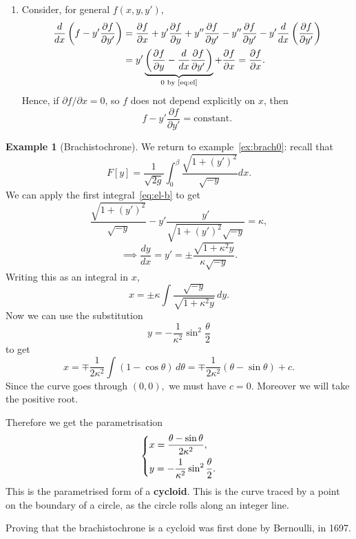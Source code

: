 \documentclass[12pt]{article}
\theoremstyle{definition}
\newtheorem{example}{Example}[section]
\theoremstyle{remark}
\begin{document}
\begin{enumerate}[resume*]
	\item Consider, for general $f(x, y, y')$,
		\begin{align*}
			\frac{d}{dx} \left(f - y' \frac{\partial f}{\partial y'} \right) &= \frac{\partial f}{\partial x} + y' \frac{\partial f}{\partial y} + y'' \frac{\partial f}{\partial y'} - y'' \frac{\partial f}{\partial y'} - y' \frac{d}{dx} \left( \frac{\partial f}{\partial y'} \right) \\
											 &= y' \underbrace{\left( \frac{\partial f}{\partial y} - \frac{d}{dx} \frac{\partial f}{\partial y'} \right)}_{0 \text{ by~\eqref{eq:el}}} + \frac{\partial f}{\partial x} = \frac{\partial f}{\partial x}.
		\end{align*}
		Hence, if $\partial f/\partial x = 0$, so $f$ does not depend explicitly on $x$, then
		\[
			f - y' \frac{\partial f}{\partial y'} = \text{constant} \tag{2.2}\label{eq:el-b}
		.\]
\end{enumerate}

\begin{adjustbox}{minipage = \columnwidth - 25.5pt, margin=1em, frame=1pt, margin=0em}
	\begin{example}[Brachistochrone]
		We return to example~\eqref{ex:brach0}: recall that
		\[
			F[y] = \frac{1}{\sqrt{2g}} \int_{0}^{\beta} \frac{\sqrt{1 + (y')^2}}{\sqrt{-y}} dx
		.\]
		We can apply the first integral~\eqref{eq:el-b} to get
		\[
			\frac{\sqrt{1 + (y')^2}}{\sqrt{-y}} - y' \frac{y'}{\sqrt{1 + (y')^2} \sqrt{-y}} = \kappa
		,\]
		\[
			\implies \frac{dy}{dx} = y' = \pm \frac{\sqrt{1 + \kappa^2y}}{\kappa \sqrt{-y}}
		.\]
		Writing this as an integral in $x$,
		\[
			x = \pm \kappa \int \frac{\sqrt{-y}}{\sqrt{1 + \kappa^2y}}\, dy
		.\]
		Now we can use the substitution
		\[
			y = -\frac{1}{\kappa^2} \sin^2 \frac{\theta}{2}
		\]
		to get
		\[
			x = \mp \frac{1}{2\kappa^2} \int (1 - \cos \theta) \, d\theta = \mp \frac{1}{2 \kappa^2} (\theta - \sin \theta) + c
		.\]
		Since the curve goes through $(0, 0),$ we must have $c = 0$. Moreover we will take the positive root.
\end{example}

\end{adjustbox}

\begin{adjustbox}{minipage = \columnwidth - 25.5pt, margin=1em, frame=1pt, margin=0em}
Therefore we get the parametrisation
\[
\begin{dcases}
	x = \frac{\theta - \sin\theta}{2 \kappa^2}, \\
	y = - \frac{1}{\kappa^2} \sin^2 \frac{\theta}{2}.
\end{dcases}
\]
This is the parametrised form of a \textbf{cycloid}. This is the curve traced by a point on the boundary of a circle, as the circle rolls along an integer line.

Proving that the brachistochrone is a cycloid was first done by Bernoulli, in 1697.
\end{adjustbox}
\end{document}
